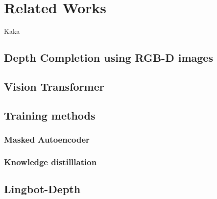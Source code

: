 \chapter{Related Works}
\lipsum[1-2]

Kaka
\section{Depth Completion using RGB-D images}
\lipsum[2-5] \cite{book2011ahad_1} \cite{oneata2013action_13}


\section{Vision Transformer}
\lipsum[2-5] \cite{usha2014motion}


\section{Training methods}
\subsection{Masked Autoencoder}

\subsection{Knowledge distilllation}

\section{Lingbot-Depth}
